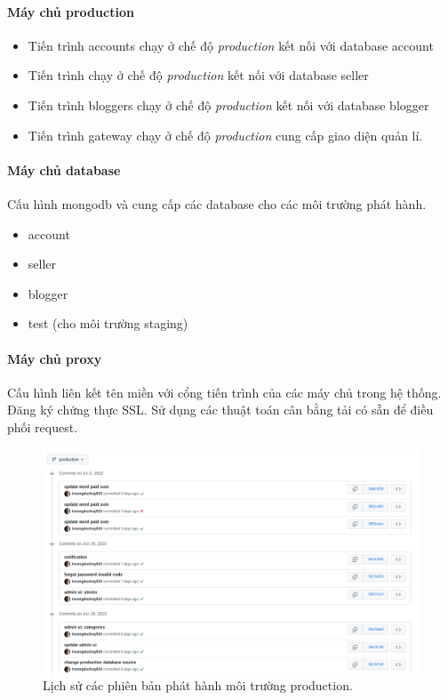 \paragraph{Máy chủ production}
\begin{itemize}
	\item Tiến trình accounts chạy ở chế độ \emph{production} kết nối với database account
	\item Tiến trình  chạy ở chế độ \emph{production} kết nối với database seller
	\item Tiến trình bloggers chạy ở chế độ \emph{production} kết nối với database blogger
	\item Tiến trình gateway chạy ở chế độ \emph{production} cung cấp giao diện quản lí.
\end{itemize}

\paragraph{Máy chủ database}
Cấu hình mongodb và cung cấp các database cho các môi trường phát hành.
\begin{itemize}
	\item account
	\item seller
	\item blogger
	\item test (cho môi trường staging)
\end{itemize}
\paragraph{Máy chủ proxy}
Cấu hình liên kết tên miền với cổng tiến trình của các máy chủ trong hệ thống. Đăng ký chứng thực SSL. Sử dụng các thuật toán cân bằng tải có sẵn để điều phối request.

\begin{figure}[h!]
	\begin{center}	
		\includegraphics[width=\textwidth]{./results/commit}
		\caption{Lịch sử các phiên bản phát hành môi trường production.}
	\end{center}
	
\end{figure}

